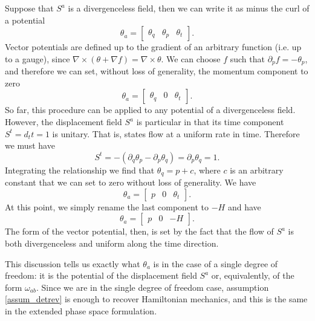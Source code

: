 Suppose that $S^a$ is a divergenceless field, then we can write it as minus the curl of a potential
\begin{equation}
	\theta_a = \begin{bmatrix}
	\theta_q & \theta_p & \theta_t
\end{bmatrix} .
\end{equation}
Vector potentials are defined up to the gradient of an arbitrary function (i.e. up to a gauge), since $\nabla \times (\theta + \nabla f) = \nabla \times \theta$. We can choose $f$ such that $\partial_p f = - \theta_p$, and therefore we can set, without loss of generality, the momentum component to zero
\begin{equation}
	\theta_a = \begin{bmatrix}
		\theta_q & 0 & \theta_t
	\end{bmatrix} .
\end{equation}
So far, this procedure can be applied to any potential of a divergenceless field. However, the displacement field $S^a$ is particular in that its time component $S^t = d_t t = 1$ is unitary. That is, states flow at a uniform rate in time. Therefore we must have
\begin{equation}
	S^t = - (\partial_q \theta_p - \partial_p \theta_q) = \partial_p \theta_q = 1.
\end{equation}
Integrating the relationship we find that $\theta_q = p + c$, where $c$ is an arbitrary constant that we can set to zero without loss of generality. We have
\begin{equation}
	\theta_a = \begin{bmatrix}
		p & 0 & \theta_t
	\end{bmatrix}.
\end{equation}
At this point, we simply rename the last component to $-H$ and have
\begin{equation}
	\theta_a = \begin{bmatrix}
		p & 0 & -H
	\end{bmatrix}.
\end{equation}
The form of the vector potential, then, is set by the fact that the flow of $S^a$ is both divergenceless and uniform along the time direction.

This discussion tells us exactly what $\theta_a$ is in the case of a single degree of freedom: it is the potential of the displacement field $S^a$ or, equivalently, of the form $\omega_{ab}$. Since we are in the single degree of freedom case, assumption \ref{assum_detrev} is enough to recover Hamiltonian mechanics, and this is the same in the extended phase space formulation.

